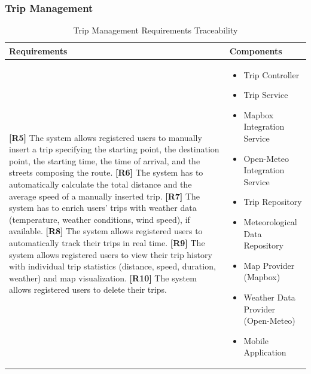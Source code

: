 \subsubsection{Trip Management}

\begin{table}[H]
\centering
\begin{tabular}{|p{}|p{}|}
\hline
\textbf{Requirements} & \textbf{Components} \\
\hline

\textbf{[R5]} The system allows registered users to manually insert a trip specifying the starting point, the destination point, the starting time, the time of arrival, and the streets composing the route. \newline
\textbf{[R6]} The system has to automatically calculate the total distance and the average speed of a manually inserted trip. \newline
\textbf{[R7]} The system has to enrich users' trips with weather data (temperature, weather conditions, wind speed), if available. \newline
\textbf{[R8]} The system allows registered users to automatically track their trips in real time. \newline
\textbf{[R9]} The system allows registered users to view their trip history with individual trip statistics (distance, speed, duration, weather) and map visualization. \newline
\textbf{[R10]} The system allows registered users to delete their trips.

&

\begin{itemize}
    \item Trip Controller
    \item Trip Service
    \item Mapbox Integration Service
    \item Open-Meteo Integration Service
    \item Trip Repository
    \item Meteorological Data Repository
    \item Map Provider (Mapbox)
    \item Weather Data Provider (Open-Meteo)
    \item Mobile Application
\end{itemize} \\
\hline

\end{tabular}
\caption{Trip Management Requirements Traceability}
\label{tab:trip-requirements}
\end{table}

